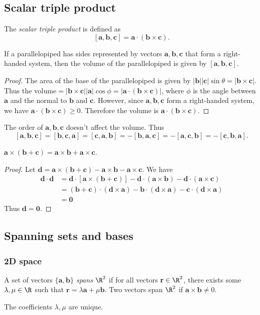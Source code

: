 \documentclass[a4paper]{article}
\begin{document}
\subsection{Scalar triple product}
\begin{defi}
  The \emph{scalar triple product} is defined as
  \[
    \mathbf{[a, b, c] = a\cdot (b\times c)}.
  \]
\end{defi}

\begin{prop}
  If a parallelopiped has sides represented by vectors $\mathbf{a, b, c}$ that form a right-handed system, then the volume of the parallelopiped is given by $\mathbf{[a, b, c]}$.
\end{prop}

\begin{proof}
  The area of the base of the parallelopiped is given by $\mathbf{|b||c|}\sin\theta = \mathbf{|b\times c|}$. Thus the volume$ = \mathbf{|b\times c||a|}\cos\phi = \mathbf{|a\cdot(b\times c)|}$, where $\phi$ is the angle between $\mathbf{a}$ and the normal to $\mathbf{b}$ and $\mathbf{c}$. However, since $\mathbf{a, b, c}$ form a right-handed system, we have $\mathbf{a\cdot (b\times c)} \geq 0$. Therefore the volume is $\mathbf{a\cdot(b\times c)}$.
\end{proof}
\note The order of $\mathbf{a, b, c}$ doesn't affect the volume. Thus
\[
  \mathbf{[a, b, c] = [b, c, a] = [c, a, b] = -[b, a, c] = -[a, c, b] = -[c, b, a]}.
\]

\begin{thm}
  $\mathbf{a\times (b + c) = a\times b + a\times c}$.
\end{thm}
\begin{proof}
  Let $\mathbf{d = a\times (b + c) - a\times b - a\times c}$. We have
  \begin{align*}
    \mathbf{d\cdot d} &= \mathbf{d\cdot[a\times (b + c)] - d\cdot(a\times b) - d\cdot(a\times c)}\\
    &= \mathbf{(b+c)\cdot(d \times a) - b\cdot(d\times a) - c\cdot(d\times a)}\\
    &= \mathbf{0}
  \end{align*}
  Thus $\mathbf{d = 0}$.
\end{proof}

\subsection{Spanning sets and bases}
\subsubsection{2D space}
\begin{defi}
  A set of vectors $\{\mathbf{a, b}\}$ \emph{spans} $\R^2$ if for all vectors $\mathbf{r}\in \R^2$, there exists some $\lambda, \mu\in \R$ such that $\mathbf{r} = \lambda\mathbf{a} + \mu\mathbf{b}$. Two vectors span $\R^2$ if $\mathbf{a\times b}\not= 0$.
\end{defi}
\begin{thm}
  The coefficients $\lambda, \mu$ are unique.
\end{thm}
\end{document}
